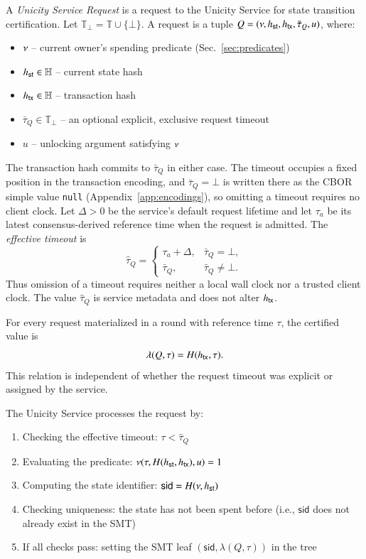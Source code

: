A \emph{Unicity Service Request} is a request to the Unicity Service for state transition certification. Let $\mathbb{T}_\bot=\mathbb{T}\cup\{\bot\}$. A request is a tuple $Q = (\nu, {h_\mathsf{st}}, {h_\mathsf{tx}}, \bar\tau_Q, u)$, where:
\begin{itemize}
	\item $\nu$ -- current owner's spending predicate (Sec.~\ref{sec:predicates})
	\item ${h_\mathsf{st}} \in \mathbb{H}$ -- current state hash
	\item ${h_\mathsf{tx}} \in \mathbb{H}$ -- transaction hash
	\item $\bar\tau_Q \in \mathbb{T}_\bot$ -- an optional explicit, exclusive request timeout
	\item $u$ -- unlocking argument satisfying $\nu$
\end{itemize}

The transaction hash commits to $\bar\tau_Q$ in either case. The timeout occupies a fixed position in the transaction encoding, and $\bar\tau_Q=\bot$ is written there as the CBOR simple value \texttt{null} (Appendix~\ref{app:encodings}), so omitting a timeout requires no client clock. Let $\Delta>0$ be the service's default request lifetime and let $\tau_a$ be its latest consensus-derived reference time when the request is admitted. The \emph{effective timeout} is
\[
	\widehat\tau_Q =
	\begin{cases}
		\tau_a+\Delta, & \bar\tau_Q=\bot,\\
		\bar\tau_Q, & \bar\tau_Q\ne\bot.
	\end{cases}
\]
Thus omission of a timeout requires neither a local wall clock nor a trusted client clock. The value $\widehat\tau_Q$ is service metadata and does not alter ${h_\mathsf{tx}}$.

For every request materialized in a round with reference time $\tau$, the certified value is
\[
	\lambda(Q,\tau)=H({h_\mathsf{tx}},\tau).
\]
This relation is independent of whether the request timeout was explicit or assigned by the service.

The Unicity Service processes the request by:
\begin{enumerate}
	\item Checking the effective timeout: $\tau < \widehat\tau_Q$
	\item Evaluating the predicate: $\nu(\tau, H({h_\mathsf{st}}, {h_\mathsf{tx}}), u) = 1$
	\item Computing the state identifier: $\mathsf{sid} = H(\nu, {h_\mathsf{st}})$
	\item Checking uniqueness: the state has not been spent before (i.e., $\mathsf{sid}$ does not already exist in the SMT)
	\item If all checks pass: setting the SMT leaf $(\mathsf{sid}, \lambda(Q,\tau))$ in the tree
\end{enumerate}

